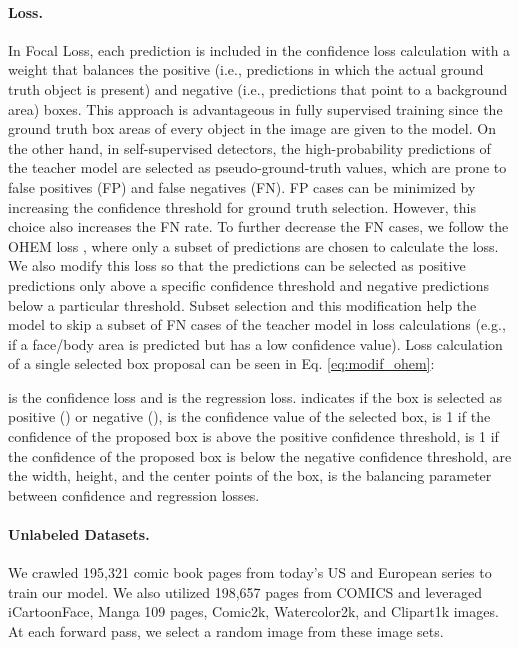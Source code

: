 \documentclass{article}
\begin{document}
\paragraph{Loss.}{In Focal Loss, each prediction is included in the confidence loss calculation with a weight that balances the positive (i.e., predictions in which the actual ground truth object is present) and negative (i.e., predictions that point to a background area) boxes. This approach is advantageous in fully supervised training since the ground truth box areas of every object in the image are given to the model. On the other hand, in self-supervised detectors, the high-probability predictions of the teacher model are selected as pseudo-ground-truth values, which are prone to false positives (FP) and false negatives (FN). FP cases can be minimized by increasing the confidence threshold for ground truth selection. However, this choice also increases the FN rate. To further decrease the FN cases, we follow the OHEM loss \cite{shrivastava2016training}, where only a subset of predictions are chosen to calculate the loss. We also modify this loss so that the predictions can be selected as positive predictions only above a specific confidence threshold and negative predictions below a particular threshold. Subset selection and this modification help the model to skip a subset of FN cases of the teacher model in loss calculations (e.g., if a face/body area is predicted but has a low confidence value). Loss calculation of a single selected box proposal can be seen in Eq. \ref{eq:modif_ohem}:



\noindent  is the confidence loss and  is the regression loss.  indicates if the box is selected as positive () or negative (),  is the confidence value of the selected box,  is 1 if the confidence of the proposed box is above the positive confidence threshold,  is 1 if the confidence of the proposed box is below the negative confidence threshold,  are the width, height, and the center points of the box,  is the balancing parameter between confidence and regression losses.}

\paragraph{Unlabeled Datasets.}{We crawled 195,321 comic book pages from today's US and European series to train our model. We also utilized 198,657 pages from COMICS and leveraged iCartoonFace, Manga 109 pages, Comic2k, Watercolor2k, and Clipart1k images. At each forward pass, we select a random image from these image sets.}
\end{document}
